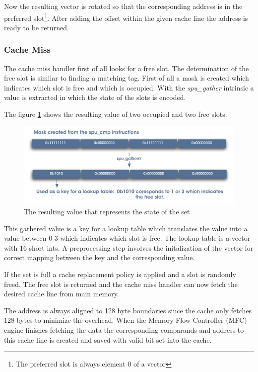 \documentclass[DIV10, abstracton, openright, footsepline, headsepline, twoside, 9pt,
bigheadings]{scrreprt}
\begin{document}
Now the resulting vector is rotated so that the corresponding address is in the
preferred slot\footnote{The preferred slot is always element 0 of a vector}. After
adding the offset within the given cache line the address is ready to be returned.


\subsubsection{Cache Miss}
\label{sec:cachem}

The cache miss handler first of all looks for a free slot. The determination of the
free slot is similar to finding a matching tag. First of all a mask is created which
indicates which slot is free and which is occupied. With the \textit{spu\_gather}
intrinsic a value is extracted in which the state of the slots is encoded.

The figure \ref{fig:slot_state} shows the resulting value of two occupied
and two free slots.

\begin{figure}[H]
\centering
\includegraphics[width=\textwidth]{diagramme/slot_state}
\caption{The resulting value that represents the state of the set}
\label{fig:slot_state}
\end{figure}

This gathered value is a key for a lookup table which translates the value into
a value between 0-3 which indicates which slot is free. The lookup table is a
vector with 16 short ints. A preprocessing step involves the initalization of the
vector for correct mapping between the key and the corresponding value.

If the set is full a cache replacement policy is applied and a slot is randomly
freed. The free slot is returned and the cache miss handler can now fetch the desired cache line from main memory.

The address is always aligned to 128 byte boundaries since the cache only fetches
128 bytes to minimize the overhead. When the Memory Flow Controller (MFC) engine
 finishes fetching the data the corresponding comparands and address to this cache
 line is created and saved with valid bit set into the cache.
\end{document}
